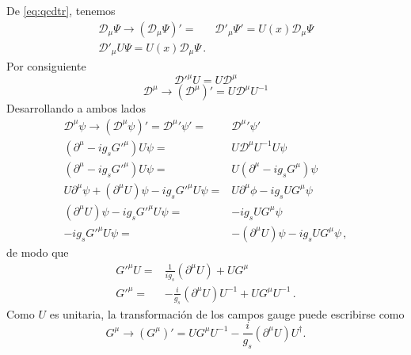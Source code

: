 De \eqref{eq:qcdtr}, tenemos
\begin{align}
   \mathcal{D}_\mu\Psi\to \left(\mathcal{D}_\mu\Psi\right)'=&\mathcal{D}'_\mu\Psi'
  =U(x)\mathcal{D}_\mu\Psi\nonumber\\
\mathcal{D}'_\mu U\Psi
  =U(x)\mathcal{D}_\mu\Psi\,.
\end{align}
Por consiguiente
\begin{equation}
  {\mathcal{D}'}^\mu U=U\mathcal{D}^\mu
\end{equation}
\begin{equation}
  \mathcal{D}^\mu\to\left(
    \mathcal{D}^\mu
  \right)'=U\mathcal{D}^\mu U^{-1}
\end{equation}
Desarrollando a ambos lados
\begin{align}
  \label{eq:251qft}
   {\mathcal{D}}^\mu\psi\to{\left({\mathcal{D}}^\mu\psi\right)}'=
  {\mathcal{D}^\mu}'\psi'=&{\mathcal{D}^\mu}'\psi'\nonumber\\
  (\partial^\mu-i g_s {G'}^\mu) U\psi=&U\mathcal{D}^\mu U^{-1}U\psi\nonumber\\
  (\partial^\mu-i g_s {G'}^\mu) U\psi=&U(\partial^\mu-i g_s {G}^\mu)\psi\nonumber\\
  U\partial^\mu\psi+(\partial^\mu U)\psi-i g_s {G'}^\mu U \psi=&U\partial^\mu\phi-i g_s U {G}^\mu \psi\nonumber\\
  (\partial^\mu U)\psi-i g_s {G'}^\mu U \psi=&-i g_s U {G}^\mu \psi\nonumber\\
  -i g_s {G'}^\mu U \psi=&-(\partial^\mu U)\psi-i g_s U {G}^\mu \psi\,,
\end{align}
de modo que
\begin{align}
     {G'}^\mu U =&\frac{1}{i g_s}(\partial^\mu U)+ U{G}^\mu \nonumber\\
   {G'}^\mu  =&-\frac{i}{g_s}(\partial^\mu U)U^{-1}+ U{G}^\mu U^{-1}\,.
\end{align}
Como $U$ es unitaria, la transformación de los campos gauge puede escribirse como
\begin{equation}
    {G}^\mu\to\left({G}^\mu\right)'=U{G}^\mu U^{-1}-\frac{i}{g_s}\left(\partial^\mu U\right)U^\dagger.
\end{equation}

